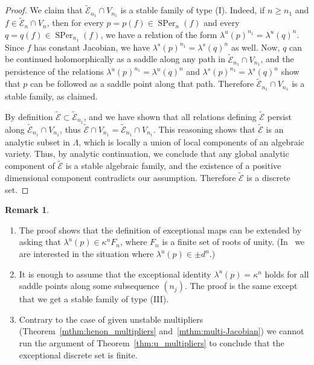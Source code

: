 \documentclass[oneside, 12pt]{amsart}
\DeclareMathOperator{\SPer}{SPer}
\theoremstyle{plain}
\theoremstyle{definition}
\newtheorem{rem}[thm]{Remark}
\numberwithin{equation}{section}       %
\numberwithin{equation}{section}       %
\begin{document}
\begin{vlongue}
\begin{proof}
We claim that  $\widetilde {\mathcal E}_{n_1}\cap V_{n_1}$ is a stable family of type (I).  Indeed,  if 
$n\geq n_1$ and $f\in \widetilde {\mathcal E}_n\cap V_n$, then 
for every $p = p(f)\in \SPer_n(f)$ and every $q= q(f)\in \SPer_{n_1}(f)$, we have a 
relation of the form $\lambda^u(p)^{n_1} = \lambda^u(q)^n$. Since $f$ has constant Jacobian, we have $\lambda^s(p)^{n_1} = \lambda^s(q)^n$ as well. 
Now, $q$ can be 
continued  holomorphically as a saddle along  any path in
$\widetilde {\mathcal E}_{n_1}\cap V_{n_1}$, and  
the persistence of the relations $\lambda^u(p)^{n_1} = \lambda^u(q)^n$ and 
$\lambda^s(p)^{n_1} = \lambda^s(q)^n$ show that $p$ can be followed 
as a saddle point along that path. Therefore $\widetilde {\mathcal E}_{n_1}\cap V_{n_1}$ is 
a stable family, as claimed. 

By definition $\widetilde {\mathcal E} \subset \widetilde {\mathcal E}_{n_1}$, 
and we have shown that all relations defining $\widetilde {\mathcal E}$ persist along $\widetilde {\mathcal E}_{n_1}\cap V_{n_1}$, 
thus $\widetilde {\mathcal E} \cap V_{n_1} =\widetilde {\mathcal E}_{n_1}\cap V_{n_1}$.
This reasoning shows that $\widetilde {\mathcal E}$ is an analytic subset in $\Lambda$, which 
is locally a union of local components of an algebraic variety. Thus, by analytic continuation, we conclude that any global analytic component of $\widetilde {\mathcal E}$ is a 
stable algebraic family, and the existence of a positive dimensional component contradicts our assumption. Therefore $\widetilde {\mathcal E}$ is a discrete set.
\end{proof}

\begin{rem}~
\begin{enumerate}[\rm (1)]
\item The proof shows that the definition of exceptional maps can be extended by asking that 
$\lambda^u(p) \in   \kappa^{n}F_n$, where $F_n$ is a  finite set of roots of unity. 
 (In~\cite[\S 2]{rigidity} we are interested in the situation where $\lambda^u(p) \in  \pm d^n$.)
\item It is enough to assume that the exceptional identity $\lambda^u(p) = \kappa^{n}$ holds for all saddle points 
along some subsequence $(n_j)$. The proof is the same except that we get a stable family of type (III). 
\item Contrary to the case of given unstable multipliers 
(Theorem~\ref{mthm:henon_multipliers} and~\ref{mthm:multi-Jacobian}) we cannot run the argument 
of Theorem~\ref{thm:u_multipliers} to conclude that the exceptional discrete set is finite. 
\end{enumerate}
\end{rem}
\end{vlongue}


 

\end{document}
